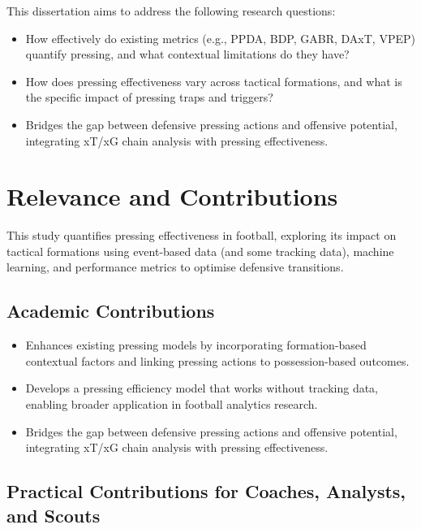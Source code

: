 This dissertation aims to address the following research questions:
\begin{itemize}
    \item How effectively do existing metrics (e.g., PPDA, BDP, GABR, DAxT, VPEP) quantify pressing, and what contextual limitations do they have?
    \item How does pressing effectiveness vary across tactical formations, and what is the specific impact of pressing traps and triggers?
    \item Bridges the gap between defensive pressing actions and offensive potential, integrating xT/xG chain analysis with pressing effectiveness.
\end{itemize}


\section{Relevance and Contributions}

This study quantifies pressing effectiveness in football, exploring its impact on tactical formations using event-based data (and some tracking data), machine learning, and performance metrics to optimise defensive transitions.

\subsection{Academic Contributions}

\begin{itemize}
    \item Enhances existing pressing models by incorporating formation-based contextual factors and linking pressing actions to possession-based outcomes.
    \item Develops a pressing efficiency model that works without tracking data, enabling broader application in football analytics research.
    \item Bridges the gap between defensive pressing actions and offensive potential, integrating xT/xG chain analysis with pressing effectiveness.
\end{itemize}


\subsection{Practical Contributions for Coaches, Analysts, and Scouts}

